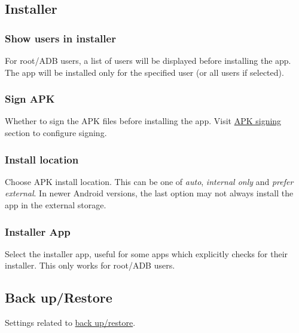 \subsection{Installer}\label{subsec:installer} %

\subsubsection{Show users in installer} %
For root/ADB users, a list of users will be displayed before installing the app.
The app will be installed only for the specified user (or all users if selected).

\subsubsection{Sign APK} %
Whether to sign the APK files before installing the app.
Visit \hyperref[subsec:apk-signing]{APK signing} section to configure signing.

\subsubsection{Install location} %
Choose APK install location.
This can be one of \textit{auto}, \textit{internal only} and \textit{prefer external}.
In newer Android versions, the last option may not always install the app in the external storage.

\subsubsection{Installer App} %
Select the installer app, useful for some apps which explicitly checks for their installer.
This only works for root/ADB users.


\subsection{Back up/Restore}\label{subsec:backup/restore} %
Settings related to \hyperref[sec:backup-restore]{back up/restore}.

